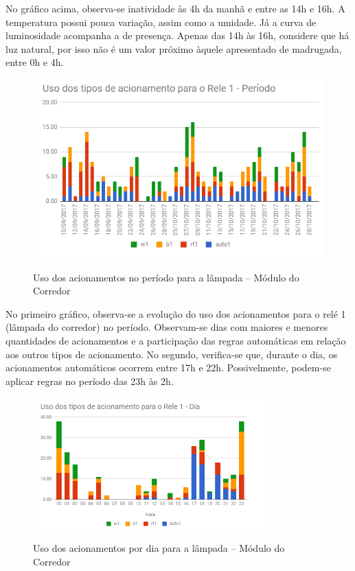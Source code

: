 No gráfico acima, observa-se inatividade às 4h da manhã e entre as 14h e 16h. A temperatura possui pouca variação, assim como a umidade. Já a curva de luminosidade acompanha a de presença. Apenas das 14h às 16h, considere que há luz natural, por isso não é um valor próximo àquele apresentado de madrugada, entre 0h e 4h.

\begin{figure}[H]
	\centering
	\caption{Uso dos acionamentos no período para a lâmpada -- Módulo do Corredor}
	\includegraphics[width=1.0\textwidth]{UsoRele1periodoCorredor}
	\label{fig:UsoRele1periodoCorredor}
\end{figure}

No primeiro gráfico, observa-se a evolução do uso dos acionamentos para o relé 1 (lâmpada do corredor) no período. Observam-se dias com maiores e menores quantidades de acionamentos e a participação das regras automáticas em relação aos outros tipos de acionamento. No segundo, verifica-se que, durante o dia, os acionamentos automáticos ocorrem entre 17h e 22h. Possivelmente, podem-se aplicar regras no período das 23h às 2h.

\begin{figure}[H]
	\centering
	\caption{Uso dos acionamentos por dia para a lâmpada -- Módulo do Corredor}
	\includegraphics[width=0.8\textwidth]{UsoRele1DiaCorredor}
	\label{fig:UsoRele1DiaCorredor}
\end{figure}

